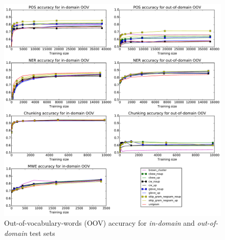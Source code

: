 \begin{figure}
\centering
\caption{Out-of-vocabulary-words (OOV) accuracy for \textit{in-domain} and \textit{out-of-domain} test sets}
\label{OOV} 
    	\includegraphics[scale=0.5]{plots/OOV-plots}
\end{figure}





